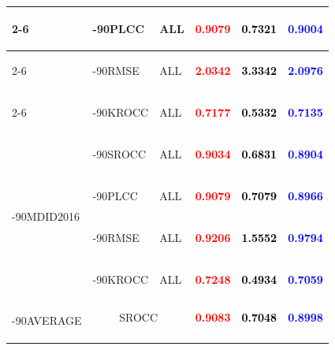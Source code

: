 \documentclass{article}
\begin{document}
\begin{table}
\begin{tabular}{||l|l|l||ccc||}
\cmidrule{2-6}\cmidrule{2-6}
&\multirow{1}{*}{\begin{turn}{-90}PLCC\end{turn}}&ALL&\textbf{\textcolor{red}{0.9079}}&\textbf{\textcolor{black}{0.7321}}&\textbf{\textcolor{blue}{0.9004}}\\
\cmidrule{2-6}\cmidrule{2-6}
&\multirow{1}{*}{\begin{turn}{-90}RMSE\end{turn}}&ALL&\textbf{\textcolor{red}{2.0342}}&\textbf{\textcolor{black}{3.3342}}&\textbf{\textcolor{blue}{2.0976}}\\
\cmidrule{2-6}\cmidrule{2-6}
&\multirow{1}{*}{\begin{turn}{-90}KROCC\end{turn}}&ALL&\textbf{\textcolor{red}{0.7177}}&\textbf{\textcolor{black}{0.5332}}&\textbf{\textcolor{blue}{0.7135}}\\
\midrule\midrule
\multirow{4}{*}{\begin{turn}{-90}MDID2016\end{turn}}&\multirow{1}{*}{\begin{turn}{-90}SROCC\end{turn}}&ALL&\textbf{\textcolor{red}{0.9034}}&\textbf{\textcolor{black}{0.6831}}&\textbf{\textcolor{blue}{0.8904}}\\
\cmidrule{2-6}\cmidrule{2-6}
&\multirow{1}{*}{\begin{turn}{-90}PLCC\end{turn}}&ALL&\textbf{\textcolor{red}{0.9079}}&\textbf{\textcolor{black}{0.7079}}&\textbf{\textcolor{blue}{0.8966}}\\
\cmidrule{2-6}\cmidrule{2-6}
&\multirow{1}{*}{\begin{turn}{-90}RMSE\end{turn}}&ALL&\textbf{\textcolor{red}{0.9206}}&\textbf{\textcolor{black}{1.5552}}&\textbf{\textcolor{blue}{0.9794}}\\
\cmidrule{2-6}\cmidrule{2-6}
&\multirow{1}{*}{\begin{turn}{-90}KROCC\end{turn}}&ALL&\textbf{\textcolor{red}{0.7248}}&\textbf{\textcolor{black}{0.4934}}&\textbf{\textcolor{blue}{0.7059}}\\
\midrule\midrule
\multirow{3}{*}{\begin{turn}{-90}AVERAGE\end{turn}}&\multicolumn{2}{c||}{SROCC}&\textbf{\textcolor{red}{0.9083}}&\textbf{\textcolor{black}{0.7048}}&\textbf{\textcolor{blue}{0.8998}}
\\ \cmidrule{2-6}

\end{tabular}
\end{table}
\end{document}
